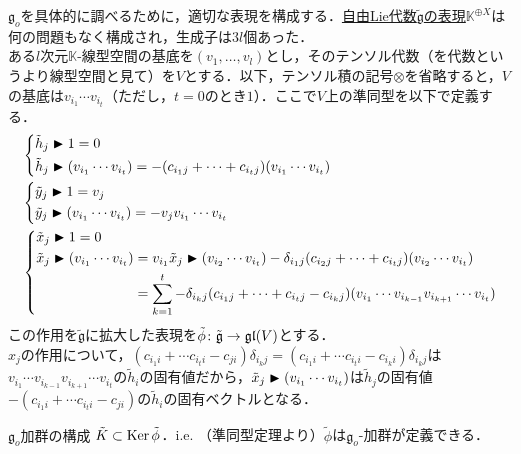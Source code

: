 \documentclass[rep_main]{subfiles}
\begin{document}
$\mathfrak{g}_o$を具体的に調べるために，適切な表現を構成する．\hyperref[def:free-Lie-alg-rep]{自由Lie代数$\tilde{\mathfrak{g}}$の表現}$\mathbb{K}^{\oplus X}$は何の問題もなく構成され，生成子は$3l$個あった．\\
ある$l$次元$\mathbb{K}$-線型空間の基底を$(v_1, \ldots , v_l)$とし，そのテンソル代数（を代数というより線型空間と見て）を$V$とする．以下，テンソル積の記号$\otimes$を省略すると，$V$の基底は$v_{i_1}\cdots v_{i_t}$（ただし，$t = 0$のとき$1$）．ここで$V$上の準同型を以下で定義する．
\begin{align}
	\label{eq:eemi-simple-ideal-rep}
	&\left\{\begin{aligned}
		&\tilde{h}_j \blacktriangleright 1 = 0 \\
		&\tilde{h}_j \blacktriangleright (v_{i_1}\cdots v_{i_t}) = -(c_{i_1j} + \cdots + c_{i_tj})(v_{i_1}\cdots v_{i_t})
	\end{aligned}\right. \\
	&\left\{\begin{aligned}
		&\tilde{y}_j \blacktriangleright 1 = v_j \\
		&\tilde{y}_j \blacktriangleright (v_{i_1}\cdots v_{i_t}) = -v_jv_{i_1}\cdots v_{i_t}
	\end{aligned}\right. \\
	&\left\{\begin{alignedat}{2}
		&\tilde{x}_j \blacktriangleright 1 = 0 \\
		&\tilde{x}_j \blacktriangleright (v_{i_1}\cdots v_{i_t}) &&= v_{i_1}\tilde{x}_j \blacktriangleright (v_{i_2}\cdots v_{i_t}) - \delta_{i_1j}(c_{i_2j} + \cdots + c_{i_tj})(v_{i_2}\cdots v_{i_t}) \\
		&\, &&= \sum_{k=1}^t -\delta_{i_kj}(c_{i_1j} + \cdots + c_{i_tj} - c_{i_kj})(v_{i_1}\cdots v_{i_{k-1}}v_{i_{k+1}}\cdots v_{i_t})
	\end{alignedat}\right.
\end{align}
この作用を$\tilde{\mathfrak{g}}$に拡大した表現を$\tilde{\phi}\colon \tilde{\mathfrak{g}} \to \mathfrak{gl}(V)$とする．\\
$x_j$の作用について，$(c_{i_1i} + \cdots c_{i_ti} - c_{ji})\delta_{i_kj} = (c_{i_1i} + \cdots c_{i_ti} - c_{i_ki})\delta_{i_kj}$は$v_{i_1}\cdots v_{i_{k-1}}v_{i_{k+1}}\cdots v_{i_t}$の$\tilde{h}_i$の固有値だから，$\tilde{x}_j \blacktriangleright (v_{i_1}\cdots v_{i_t})$は$\tilde{h}_j$の固有値$-(c_{i_1i} + \cdots c_{i_ti} - c_{ji})$の$\tilde{h}_i$の固有ベクトルとなる．
\begin{myprop}[label=prop:aaaaaaaaaaa]{$\mathfrak{g}_o$加群の構成}
	$\tilde{K} \subset \operatorname{Ker}\tilde{\phi}$．i.e. （準同型定理より）$\tilde{\phi}$は$\mathfrak{g}_o$-加群が定義できる．
\end{myprop}
\end{document}
